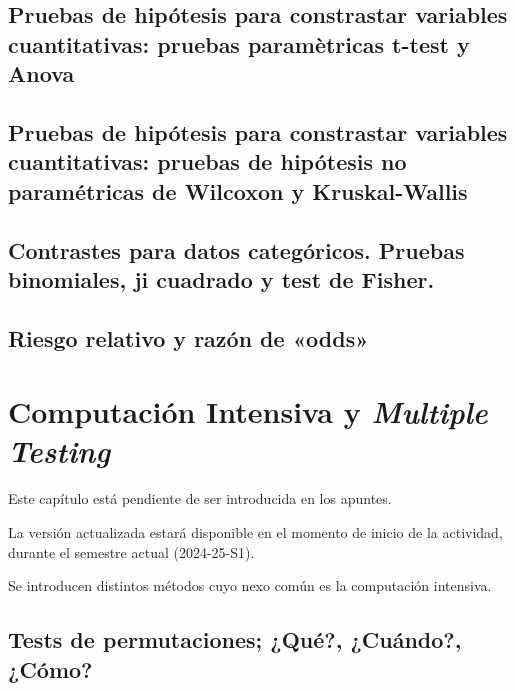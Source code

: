 \documentclass[
]{article}
\begin{document}
\subsection{Pruebas de hipótesis para constrastar variables cuantitativas: pruebas paramètricas t-test y Anova}\label{pruebas-de-hipuxf3tesis-para-constrastar-variables-cuantitativas-pruebas-paramuxe8tricas-t-test-y-anova}

\subsection{Pruebas de hipótesis para constrastar variables cuantitativas: pruebas de hipótesis no paramétricas de Wilcoxon y Kruskal-Wallis}\label{pruebas-de-hipuxf3tesis-para-constrastar-variables-cuantitativas-pruebas-de-hipuxf3tesis-no-paramuxe9tricas-de-wilcoxon-y-kruskal-wallis}

\subsection{Contrastes para datos categóricos. Pruebas binomiales, ji cuadrado y test de Fisher.}\label{contrastes-para-datos-categuxf3ricos.-pruebas-binomiales-ji-cuadrado-y-test-de-fisher.}

\subsection{Riesgo relativo y razón de «odds»}\label{riesgo-relativo-y-razuxf3n-de-odds}

\section{\texorpdfstring{Computación Intensiva y \emph{Multiple Testing}}{Computación Intensiva y Multiple Testing}}\label{computaciuxf3n-intensiva-y-multiple-testing}

Este capítulo está pendiente de ser introducida en los apuntes.

La versión actualizada estará disponible en el momento de inicio de la actividad, durante el semestre actual (2024-25-S1).

Se introducen distintos métodos cuyo nexo común es la computación intensiva.

\subsection{Tests de permutaciones; ¿Qué?, ¿Cuándo?, ¿Cómo?}\label{tests-de-permutaciones-quuxe9-cuuxe1ndo-cuxf3mo}
\end{document}
